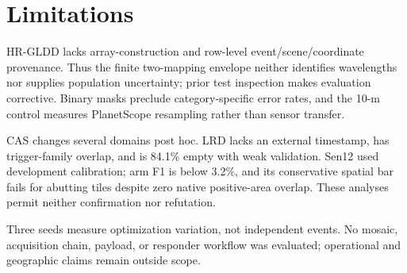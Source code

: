\section{Limitations}
\label{sec:limitations}

HR-GLDD lacks array-construction and row-level event/scene/coordinate
provenance. Thus the finite two-mapping envelope neither identifies
wavelengths nor supplies population uncertainty; prior test inspection makes
evaluation corrective. Binary masks preclude category-specific error rates, and
the 10-m control measures PlanetScope resampling rather than sensor transfer.

CAS changes several domains post hoc. LRD lacks an external timestamp, has
trigger-family overlap, and is 84.1\% empty with weak validation. Sen12 used
development calibration; arm F1 is below 3.2\%, and its conservative spatial
bar fails for abutting tiles despite zero native positive-area overlap. These
analyses permit neither confirmation nor refutation.

Three seeds measure optimization variation, not independent events. No mosaic,
acquisition chain, payload, or responder workflow was evaluated; operational
and geographic claims remain outside scope.
